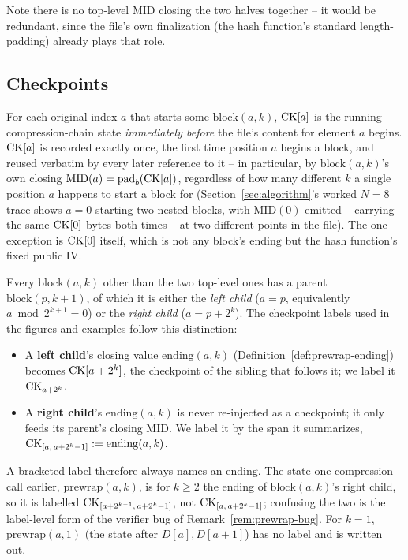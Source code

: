 Note there is no top-level $\mathrm{MID}$ closing the two halves together --
it would be redundant, since the file's own finalization (the hash
function's standard length-padding) already plays that role.

\subsection{Checkpoints}

\begin{definition}[Checkpoint]
For each original index $a$ that starts some $\mathrm{block}(a,k)$, $\mathrm{CK}[a]$
is the running compression-chain state \emph{immediately before} the file's
content for element $a$ begins. $\mathrm{CK}[a]$ is recorded exactly once, the
first time position $a$ begins a block, and reused verbatim by every later
reference to it -- in particular, by $\mathrm{block}(a,k)$'s own closing
$\mathrm{MID}(a) = \mathrm{pad}_b(\mathrm{CK}[a])$, regardless of how many different
$k$ a single position $a$ happens to start a block for (Section~\ref{sec:algorithm}'s
worked $N{=}8$ trace shows $a=0$ starting two nested blocks, with
$\mathrm{MID}(0)$ emitted -- carrying the same $\mathrm{CK}[0]$ bytes both times --
at two different points in the file). The one exception is $\mathrm{CK}[0]$ itself,
which is not any block's $\mathrm{ending}$ but the hash function's fixed
public $\mathrm{IV}$.
\end{definition}

Every $\mathrm{block}(a,k)$ other than the two top-level ones has a parent
$\mathrm{block}(p,k{+}1)$, of which it is either the \emph{left child}
($a = p$, equivalently $a \bmod 2^{k+1} = 0$) or the \emph{right child}
($a = p + 2^k$). The checkpoint labels used in the figures and examples
follow this distinction:
\begin{itemize}
\item A \textbf{left child}'s closing value $\mathrm{ending}(a,k)$
  (Definition~\ref{def:prewrap-ending}) becomes $\mathrm{CK}[a+2^k]$, the
  checkpoint of the sibling that follows it; we label it $\mathrm{CK}_{a+2^k}$.
\item A \textbf{right child}'s $\mathrm{ending}(a,k)$ is never re-injected
  as a checkpoint; it only feeds its parent's closing $\mathrm{MID}$. We
  label it by the span it summarizes, $\mathrm{CK}_{[a,\,a+2^k-1]} :=
  \mathrm{ending}(a,k)$.
\end{itemize}
A bracketed label therefore always names an $\mathrm{ending}$. The state
one compression call earlier, $\mathrm{prewrap}(a,k)$, is for $k \ge 2$ the
ending of $\mathrm{block}(a,k)$'s right child, so it is labelled
$\mathrm{CK}_{[a+2^{k-1},\,a+2^k-1]}$, not $\mathrm{CK}_{[a,\,a+2^k-1]}$; confusing the two
is the label-level form of the verifier bug of Remark~\ref{rem:prewrap-bug}.
For $k=1$, $\mathrm{prewrap}(a,1)$ (the state after $D[a], D[a+1]$) has no
label and is written out.

